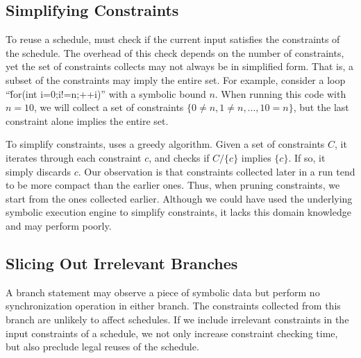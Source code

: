



\subsection{Simplifying Constraints} \label{sec:simplify}

To reuse a schedule, \tern must check if the current input satisfies the
constraints of the schedule.  The overhead of this check depends on the
number of constraints, yet the set of constraints \tern collects may not
always be in simplified form.  That is, a subset of the constraints may
imply the entire set.  For example, consider a loop ``\v{for(int
  i=0;i!=n;++i)}'' with a symbolic bound $n$.  When running this code with
$n=10$, we will collect a set of constraints $\{0 \neq n, 1 \neq n, ...,
10 = n\}$, but the last constraint alone implies the entire set.

To simplify constraints, \tern uses a greedy algorithm.  Given a set of
constraints $C$, it iterates through each constraint $c$, and checks if
$C/\{c\}$ implies $\{c\}$.  If so, it simply discards $c$.  Our
observation is that constraints collected later in a run tend to be more
compact than the earlier ones.  Thus, when pruning constraints, we start
from the ones collected earlier.  Although we could have used the
underlying symbolic execution engine to simplify constraints, it lacks
this domain knowledge and may perform poorly.

\subsection{Slicing Out Irrelevant Branches} \label{sec:slicing}

A branch statement may observe a piece of symbolic data but perform no
synchronization operation in either branch.  The constraints collected
from this branch are unlikely to affect schedules.  If we include
irrelevant constraints in the input constraints of a schedule, we not only
increase constraint checking time, but also preclude legal reuses of the
schedule.

